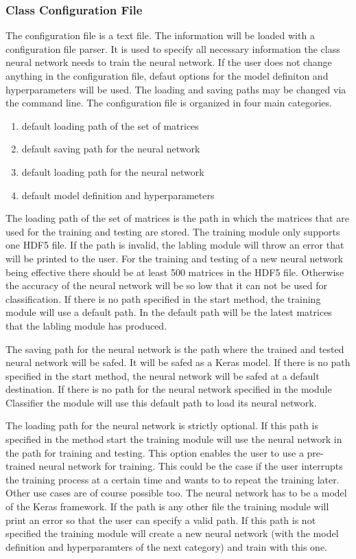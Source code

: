 \documentclass[parskip=full]{scrartcl}
\begin{document}
\subsubsection{Class Configuration File}
The configuration file is a text file. The information will be loaded with a configuration file parser.
It is used to specify all necessary information the class \gls{neural network} needs to train the neural network.
If the user does not change anything in the configuration file, defaut options for the model definiton and hyperparameters will be used.
The loading and saving paths may be changed via the command line. The configuration file is organized in four main categories.
\begin{enumerate}
\item default loading path of the set of matrices 
\item default saving path for the \gls{neural network}
\item default loading path for the \gls{neural network}
\item default model definition and hyperparameters
\end{enumerate}
The loading path of the set of matrices is the path in which the matrices that are used for the training and testing are stored.
The training module only supports one \gls{HDF5} file.
If the path is invalid, the labling module will throw an error that will be printed to the user.
For the training and testing of a new neural network being effective there should be at least 500 matrices in the \gls{HDF5} file.
Otherwise the accuracy of the \gls{neural network} will be so low that it can not be used for classification.
If there is no path specified in the start method, the training module will use a default path.
In the default path will be the latest matrices that the labling module has produced. \newline

The saving path for the \gls{neural network} is the path where the trained and tested \gls{neural network} will be safed.
It will be safed as a Keras model.
If there is no path specified in the start method, the \gls{neural network} will be safed at a default destination.
If there is no path for the \gls{neural network} specified in the module Classifier the module will use this default path to load its \gls{neural network}.\newline

The loading path for the \gls{neural network} is strictly optional.
If this path is specified in the method start the training module will use the \gls{neural network} in the path for training and testing.
This option enables the user to use a pre-trained \gls{neural network} for training.
This could be the case if the user interrupts the training process at a certain time and wants to to repeat the training later.
Other use cases are of course possible too.
The \gls{neural network} has to be a model of the Keras framework.
If the path is any other file the training module will print an error so that the user can specify a valid path.
If this path is not specified the training module will create a new \gls{neural network} (with the model definition and hyperparamters of the next category) and train with this one. \newline
\end{document}
